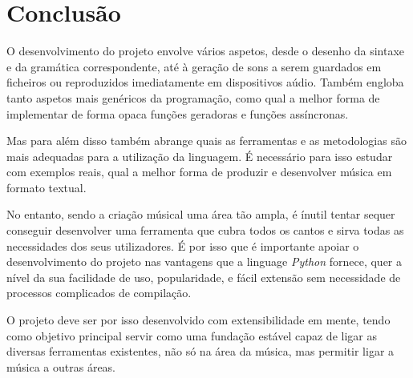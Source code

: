 \chapter{Conclusão}
O desenvolvimento do projeto envolve vários aspetos, desde o desenho da sintaxe e da gramática correspondente, até à geração de sons a serem guardados em ficheiros ou reproduzidos imediatamente em dispositivos aúdio. Também engloba tanto aspetos mais genéricos da programação, como qual a melhor forma de implementar de forma opaca funções geradoras e funções assíncronas.

Mas para além disso também abrange quais as ferramentas e as metodologias são mais adequadas para a utilização da linguagem. É necessário para isso estudar com exemplos reais, qual a melhor forma de produzir e desenvolver música em formato textual.

No entanto, sendo a criação músical uma área tão ampla, é ínutil tentar sequer conseguir desenvolver uma ferramenta que cubra todos os cantos e sirva todas as necessidades dos seus utilizadores. É por isso que é importante apoiar o desenvolvimento do projeto nas vantagens que a linguage \textit{Python} fornece, quer a nível da sua facilidade de uso, popularidade, e fácil extensão sem necessidade de processos complicados de compilação.

O projeto deve ser por isso desenvolvido com extensibilidade em mente, tendo como objetivo principal servir como uma fundação estável capaz de ligar as diversas ferramentas existentes, não só na área da música, mas permitir ligar a música a outras áreas.
